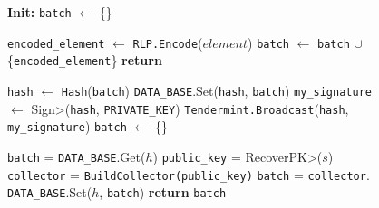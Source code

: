 \begin{figure}[t!]
  \begin{adjustbox}{minipage=[t]{\columnwidth}}
    \begin{algorithm}[H]
      \renewcommand{\thealgorithm}{Hash Collector}         
      \caption{}%
      \label{alg:collector-hash}%
      \small
      \begin{algorithmic}[1]
            \State \textbf{Init:} \texttt{batch} $\leftarrow$ \{\}
      
            \label{alg:hash_add_tx}
            			\State \texttt{encoded\_element} $\leftarrow$ \texttt{RLP.Encode}($element$)
					        \State \texttt{batch} $\leftarrow$ \texttt{batch} $\cup$ \{\texttt{encoded\_element}\}
                \EndIf
                \State \textbf{return}
            \EndFunction

            \smallskip

              \State \texttt{hash} $\leftarrow$  \texttt{Hash}(\texttt{batch})
              \State \texttt{DATA\_BASE}.Set(\texttt{hash}, \texttt{batch})
              \State \texttt{my\_signature} $\leftarrow$ \<Sign>(\texttt{hash}, \texttt{PRIVATE\_KEY})
              \State \texttt{Tendermint.Broadcast}(\texttt{hash}, \texttt{my\_signature})
              \State \texttt{batch} $\leftarrow$ \{\}
            \EndWhen

            \label{alg:hash_request_tx}
                \State \texttt{batch} = \texttt{DATA\_BASE}.Get($h$)
              \Else
                \State \texttt{public\_key} = \<RecoverPK>($s$)
                \State \texttt{collector} = \texttt{BuildCollector(public\_key)}
                \State \texttt{batch} = \texttt{collector}.
                  \State \texttt{DATA\_BASE}.Set($h$, \texttt{batch})
                \EndIf   
              \EndIf
              \State \textbf{return} \texttt{batch}
            \EndFunction
            
        \end{algorithmic}
      \end{algorithm}
	\end{adjustbox}
  \end{figure}
